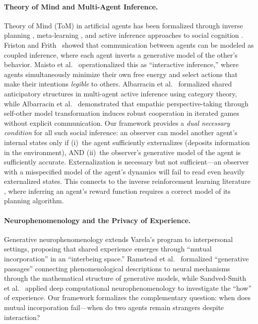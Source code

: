 \documentclass[runningheads]{llncs}
\begin{document}
\paragraph{Theory of Mind and Multi-Agent Inference.}
Theory of Mind (ToM) in artificial agents has been formalized through inverse planning \cite{baker2017rational}, meta-learning \cite{rabinowitz2018machine}, and active inference approaches to social cognition \cite{friston2015duet,veissiere2020thinking,vasil2020communication}. Friston and Frith~\cite{friston2015duet} showed that communication between agents can be modeled as coupled inference, where each agent inverts a generative model of the other's behavior. Maisto et al.~\cite{maisto2023interactive} operationalized this as ``interactive inference,'' where agents simultaneously minimize their own free energy and select actions that make their intentions \emph{legible} to others. Albarracin et al.~\cite{albarracin2024protentions} formalized shared anticipatory structures in multi-agent active inference using category theory, while Albarracin et al.~\cite{albarracin2026empathy} demonstrated that empathic perspective-taking through self-other model transformation induces robust cooperation in iterated games without explicit communication. Our framework provides a \emph{dual necessary condition} for all such social inference: an observer can model another agent's internal states only if (i)~the agent sufficiently externalizes (deposits information in the environment), AND (ii)~the observer's generative model of the agent is sufficiently accurate. Externalization is necessary but not sufficient---an observer with a misspecified model of the agent's dynamics will fail to read even heavily externalized states. This connects to the inverse reinforcement learning literature \cite{baker2017rational}, where inferring an agent's reward function requires a correct model of its planning algorithm.

\paragraph{Neurophenomenology and the Privacy of Experience.}
Generative neurophenomenology \cite{monnier2025generative} extends Varela's program \cite{varela1996neurophenomenology} to interpersonal settings, proposing that shared experience emerges through ``mutual incorporation'' in an ``interbeing space.'' Ramstead et al.~\cite{ramstead2022generative} formalized ``generative passages'' connecting phenomenological descriptions to neural mechanisms through the mathematical structure of generative models, while Sandved-Smith et al.~\cite{sandvedsmith2025deep} applied deep computational neurophenomenology to investigate the ``how'' of experience. Our framework formalizes the complementary question: when does mutual incorporation fail---when do two agents remain strangers despite interaction?
\end{document}
